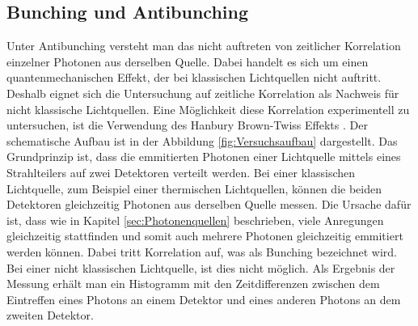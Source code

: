 \subsection{Bunching und Antibunching}\label{sec:Bunching}
Unter Antibunching versteht man das nicht auftreten von zeitlicher Korrelation einzelner Photonen aus derselben Quelle. Dabei handelt es sich um einen quantenmechanischen Effekt, der bei klassischen Lichtquellen nicht auftritt.  Deshalb eignet sich die Untersuchung auf zeitliche Korrelation als Nachweis für nicht klassische Lichtquellen. 
Eine Möglichkeit diese Korrelation experimentell zu untersuchen, ist die Verwendung des Hanbury Brown-Twiss Effekts \cite{brouri}. Der schematische Aufbau ist in der Abbildung \ref{fig:Versuchsaufbau} dargestellt. Das Grundprinzip ist, dass die emmitierten Photonen einer Lichtquelle mittels eines Strahlteilers auf zwei Detektoren verteilt werden. Bei einer klassischen Lichtquelle, zum Beispiel einer thermischen Lichtquellen, können die beiden Detektoren gleichzeitig Photonen aus derselben Quelle messen. Die Ursache dafür ist, dass wie in Kapitel \ref{sec:Photonenquellen} beschrieben, viele Anregungen gleichzeitig stattfinden und somit auch mehrere Photonen gleichzeitig emmitiert werden können. Dabei tritt Korrelation auf, was als Bunching bezeichnet wird. Bei einer nicht klassischen Lichtquelle, ist dies nicht möglich. Als Ergebnis der Messung erhält man ein Histogramm mit den Zeitdifferenzen zwischen dem Eintreffen eines Photons an einem Detektor und eines anderen Photons an dem zweiten  Detektor. 

